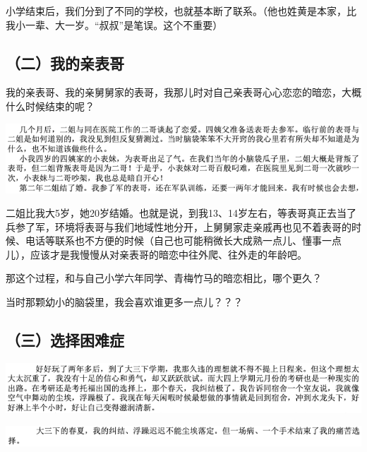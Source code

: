 \documentclass[9pt, b5paper]{article}
\begin{document}
小学结束后，我们分到了不同的学校，也就基本断了联系。（他也姓黄是本家，比我小一辈、大一岁。“叔叔”是笔误。这个不重要）

\subsection{（二）我的亲表哥}
\label{sec:org8623df7}

我的亲表哥、我的亲舅舅家的表哥，我那儿时对自己亲表哥心心恋恋的暗恋，大概什么时候结束的呢？

\begin{center}
\includegraphics[width=.9\linewidth]{./pic/backups_plans_20210422_163858.png}
\end{center}

二姐比我大5岁，她20岁结婚。也就是说，到我13、14岁左右，等表哥真正去当了兵参了军，环境将表哥与我们地域性地分开，上舅舅家走亲戚再也见不着表哥的时候、电话等联系也不方便的时候（自己也可能稍微长大成熟一点儿、懂事一点儿），应该才是我慢慢从对亲表哥的暗恋中往外爬、往外走的年龄吧。

那这个过程，和与自己小学六年同学、青梅竹马的暗恋相比，哪个更久？

当时那颗幼小的脑袋里，我会喜欢谁更多一点儿？？？

\subsection{（三）选择困难症}
\label{sec:orga41a70a}

\begin{center}
\includegraphics[width=.9\linewidth]{./pic/backups_plans_20210422_164406.png}
\end{center}

\begin{center}
\includegraphics[width=.9\linewidth]{./pic/backups_plans_20210422_164435.png}
\end{center}
\end{document}
